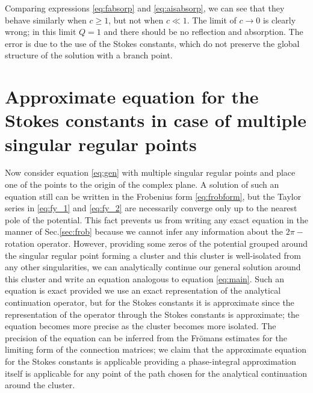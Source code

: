 \documentclass[aip,jmp,reprint]{revtex4-1}
\begin{document}
Comparing expressions \eqref{eq:fabsorp} and \eqref{eq:aisabsorp}, we can see that 
they behave similarly when $c \geq 1$, 
but not when $c \ll 1$. The limit of $c\rightarrow 0$ is clearly wrong; in this limit $Q=1$
and there should be no reflection and absorption. The error is due to the use of the Stokes constants, 
which do not preserve the global structure of the solution with a branch point. 

\section{Approximate equation for the Stokes constants in case of multiple singular regular points \label{sec:approx}}

Now consider equation \eqref{eq:gen} with multiple singular regular points and place one of the points
to the origin of the complex plane. A solution of such an equation still can be written in
the Frobenius form \eqref{eq:frobform}, but the Taylor series in \eqref{eq:fy_1} and \eqref{eq:fy_2}
are necessarily converge only up to the nearest pole of the potential\cite{cbbook}. This fact
prevents us from writing any exact equation in the manner of Sec.\ref{sec:frob} because
we cannot infer any information about the $2\pi-$rotation operator. However, providing some
zeros of the potential grouped around the singular regular point forming a cluster and this cluster is
well-isolated from any other singularities, we can analytically continue our general solution
around this cluster and write an equation analogous to equation \eqref{eq:main}. Such an equation
is exact provided we use an exact representation of the analytical continuation operator, but
for the Stokes constants it is approximate since the representation of the operator
through the Stokes constants is approximate; the equation becomes more precise as the cluster
becomes more isolated. The precision of the equation can be inferred from the Fr\"omans estimates 
for the limiting form of the connection matrices\cite{frbook}; we claim that the approximate equation 
for the Stokes constants is applicable providing a phase-integral approximation itself is applicable 
for any point of the path chosen for the analytical continuation around the cluster.
 
\end{document}
